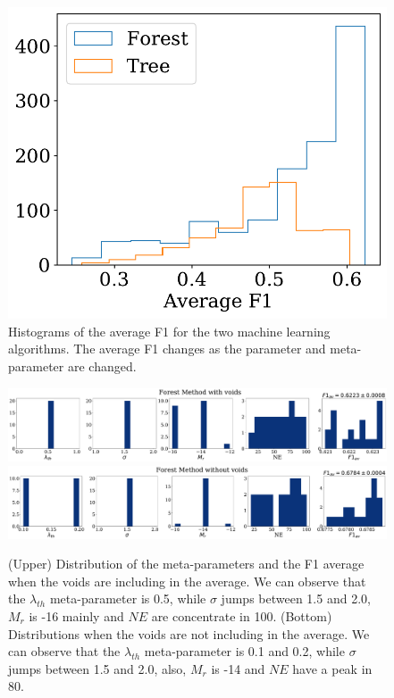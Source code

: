 \documentclass[usenatbib]{mnras}
\begin{document}
\begin{figure}
    \includegraphics[scale=0.55]{Figs/p_hist_f1.pdf}
    \caption{Histograms of the average F1 for the two machine
      learning algorithms.
      The average F1 changes as the parameter and meta-parameter
      are changed.}
    \label{fig:methods}
\end{figure}


\begin{figure}
\centering
    \includegraphics[scale=0.23]{Figs/p_features_Forest_F1_av.pdf}
    \includegraphics[scale=0.23]{Figs/p_features_Forest_F1_av_no_voids.pdf}
    \caption{(Upper) Distribution of the meta-parameters and the F1 average
      when the voids are including in the average. We can observe that
      the $\lambda_{th}$ meta-parameter is 0.5, while $\sigma$
      jumps between 1.5 and 2.0, $M_r$ is -16 mainly and $NE$ are concentrate in 100.
      (Bottom) Distributions when the voids are not including in the average. We can observe that
      the $\lambda_{th}$ meta-parameter is 0.1 and 0.2, while $\sigma$
      jumps between 1.5 and 2.0, also, $M_r$ is -14 and $NE$ have a peak in 80.
      } 
    \label{fig:features_score}    
\end{figure}
\end{document}
